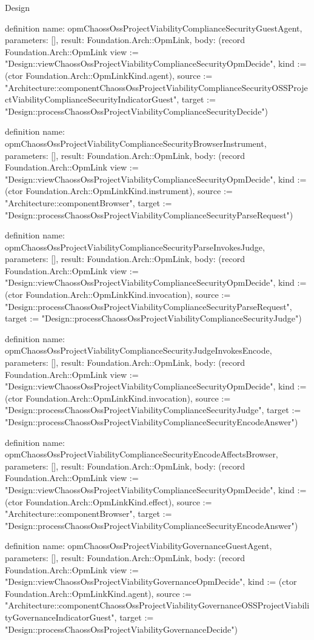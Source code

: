 \begin{lexlean}{Design}
\begin{semanticmodule}
definition{
  name: opmChaossOssProjectViabilityComplianceSecurityGuestAgent,
  parameters: [],
  result: Foundation.Arch::OpmLink,
  body: (record Foundation.Arch::OpmLink {view := "Design::viewChaossOssProjectViabilityComplianceSecurityOpmDecide", kind := (ctor Foundation.Arch::OpmLinkKind.agent), source := "Architecture::componentChaossOssProjectViabilityComplianceSecurityOSSProjectViabilityComplianceSecurityIndicatorGuest", target := "Design::processChaossOssProjectViabilityComplianceSecurityDecide"})
}

definition{
  name: opmChaossOssProjectViabilityComplianceSecurityBrowserInstrument,
  parameters: [],
  result: Foundation.Arch::OpmLink,
  body: (record Foundation.Arch::OpmLink {view := "Design::viewChaossOssProjectViabilityComplianceSecurityOpmDecide", kind := (ctor Foundation.Arch::OpmLinkKind.instrument), source := "Architecture::componentBrowser", target := "Design::processChaossOssProjectViabilityComplianceSecurityParseRequest"})
}

definition{
  name: opmChaossOssProjectViabilityComplianceSecurityParseInvokesJudge,
  parameters: [],
  result: Foundation.Arch::OpmLink,
  body: (record Foundation.Arch::OpmLink {view := "Design::viewChaossOssProjectViabilityComplianceSecurityOpmDecide", kind := (ctor Foundation.Arch::OpmLinkKind.invocation), source := "Design::processChaossOssProjectViabilityComplianceSecurityParseRequest", target := "Design::processChaossOssProjectViabilityComplianceSecurityJudge"})
}

definition{
  name: opmChaossOssProjectViabilityComplianceSecurityJudgeInvokesEncode,
  parameters: [],
  result: Foundation.Arch::OpmLink,
  body: (record Foundation.Arch::OpmLink {view := "Design::viewChaossOssProjectViabilityComplianceSecurityOpmDecide", kind := (ctor Foundation.Arch::OpmLinkKind.invocation), source := "Design::processChaossOssProjectViabilityComplianceSecurityJudge", target := "Design::processChaossOssProjectViabilityComplianceSecurityEncodeAnswer"})
}

definition{
  name: opmChaossOssProjectViabilityComplianceSecurityEncodeAffectsBrowser,
  parameters: [],
  result: Foundation.Arch::OpmLink,
  body: (record Foundation.Arch::OpmLink {view := "Design::viewChaossOssProjectViabilityComplianceSecurityOpmDecide", kind := (ctor Foundation.Arch::OpmLinkKind.effect), source := "Architecture::componentBrowser", target := "Design::processChaossOssProjectViabilityComplianceSecurityEncodeAnswer"})
}

definition{
  name: opmChaossOssProjectViabilityGovernanceGuestAgent,
  parameters: [],
  result: Foundation.Arch::OpmLink,
  body: (record Foundation.Arch::OpmLink {view := "Design::viewChaossOssProjectViabilityGovernanceOpmDecide", kind := (ctor Foundation.Arch::OpmLinkKind.agent), source := "Architecture::componentChaossOssProjectViabilityGovernanceOSSProjectViabilityGovernanceIndicatorGuest", target := "Design::processChaossOssProjectViabilityGovernanceDecide"})
}


\end{semanticmodule}
\end{lexlean}
